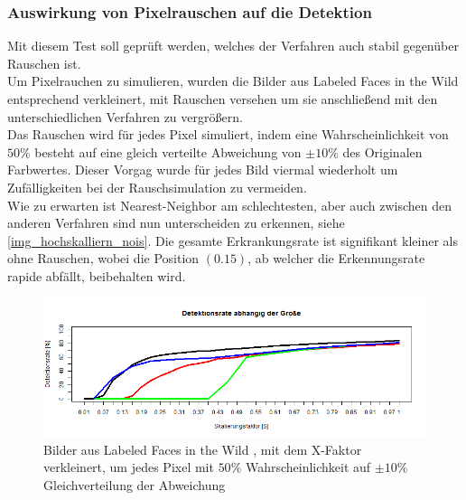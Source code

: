 \subsubsection{Auswirkung von Pixelrauschen auf die Detektion}
Mit diesem Test soll geprüft werden, welches der Verfahren auch stabil gegenüber Rauschen ist.\\
Um Pixelrauchen zu simulieren, wurden die Bilder aus Labeled Faces in the Wild \cite{database_Face} entsprechend verkleinert, mit Rauschen versehen um sie anschließend mit den unterschiedlichen Verfahren zu vergrößern.\\
Das Rauschen wird für jedes Pixel simuliert, indem eine Wahrscheinlichkeit von $50\%$ besteht auf eine gleich verteilte Abweichung von $\pm 10\%$ des Originalen Farbwertes. Dieser Vorgag wurde für jedes Bild viermal wiederholt um Zufälligkeiten bei der Rauschsimulation zu vermeiden.\\
Wie zu erwarten ist Nearest-Neighbor am schlechtesten, aber auch zwischen den anderen Verfahren sind nun unterscheiden zu erkennen, siehe \autoref{img_hochskalliern_nois}. Die gesamte Erkrankungsrate ist signifikant kleiner als ohne Rauschen, wobei die Position $(0.15)$, ab welcher die Erkennungsrate rapide abfällt, beibehalten wird.
\begin{figure}
	\centering
 	\includegraphics[width=\linewidth]{img_Skalierung/Hochskalliern_Nois}
	\caption{Bilder aus Labeled Faces in the Wild \cite{database_Face}, mit dem X-Faktor verkleinert, um jedes Pixel mit $50\%$ Wahrscheinlichkeit auf $\pm 10\%$ Gleichverteilung der Abweichung}
	\label{img_hochskalliern_nois}
\end{figure}

